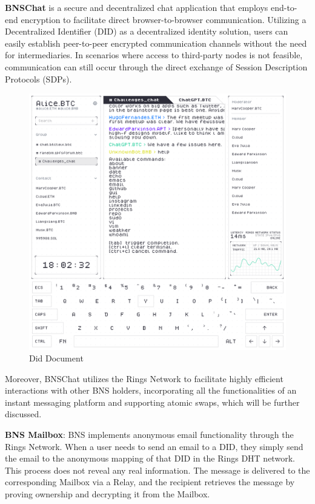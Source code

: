 \documentclass[twocolumn]{article}
\begin{document}
\textbf{BNSChat} is a secure and decentralized chat application that employs end-to-end encryption to facilitate direct browser-to-browser communication. Utilizing a Decentralized Identifier (DID) as a decentralized identity solution, users can easily establish peer-to-peer encrypted communication channels without the need for intermediaries. In scenarios where access to third-party nodes is not feasible, communication can still occur through the direct exchange of Session Description Protocols (SDPs).

\begin{figure}[htbp]
  \includegraphics[width=\linewidth]{imgs/chat.jpg}
  \caption{Did Document}
  \label{diddoc}

\end{figure}
Moreover, BNSChat utilizes the Rings Network to facilitate highly efficient interactions with other BNS holders, incorporating all the functionalities of an instant messaging platform and supporting atomic swaps, which will be further discussed.

\textbf{BNS Mailbox}: BNS implements anonymous email functionality through the Rings Network. When a user needs to send an email to a DID, they simply send the email to the anonymous mapping of that DID in the Rings DHT network. This process does not reveal any real information. The message is delivered to the corresponding Mailbox via a Relay, and the recipient retrieves the message by proving ownership and decrypting it from the Mailbox.
\end{document}
